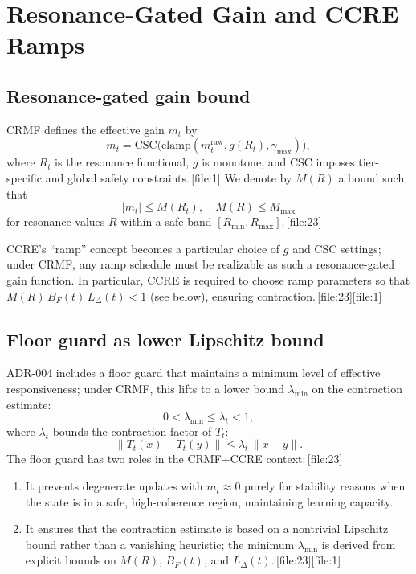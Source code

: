\documentclass[11pt]{article}
\begin{document}
\section{Resonance-Gated Gain and CCRE Ramps}

\subsection{Resonance-gated gain bound}

CRMF defines the effective gain $m_t$ by
\[
  m_t = \mathrm{CSC}\bigl(\mathrm{clamp}(m^{\mathrm{raw}}_t, g(R_t), \gamma_{\max})\bigr),
\]
where $R_t$ is the resonance functional, $g$ is monotone, and CSC imposes tier-specific and global safety constraints.\,[file:1]
We denote by $M(R)$ a bound such that
\begin{equation}
  |m_t| \le M(R_t),\quad M(R) \le M_{\max}
\end{equation}
for resonance values $R$ within a safe band $[R_{\min},R_{\max}]$.\,[file:23]

CCRE's ``ramp'' concept becomes a particular choice of $g$ and CSC settings; under CRMF, any ramp schedule must be realizable as such a resonance-gated gain function.
In particular, CCRE is required to choose ramp parameters so that $M(R)\,B_F(t)\,L_\Delta(t) < 1$ (see below), ensuring contraction.\,[file:23][file:1]

\subsection{Floor guard as lower Lipschitz bound}

ADR-004 includes a floor guard that maintains a minimum level of effective responsiveness; under CRMF, this lifts to a lower bound $\lambda_{\min}$ on the contraction estimate:
\[
  0 < \lambda_{\min} \le \lambda_t < 1,
\]
where $\lambda_t$ bounds the contraction factor of $T_t$:
\[
  \|T_t(x) - T_t(y)\| \le \lambda_t\,\|x-y\|.
\]
The floor guard has two roles in the CRMF+CCRE context:\,[file:23]
\begin{enumerate}[leftmargin=1.5em]
  \item It prevents degenerate updates with $m_t\approx 0$ purely for stability reasons when the state is in a safe, high-coherence region, maintaining learning capacity.
  \item It ensures that the contraction estimate is based on a nontrivial Lipschitz bound rather than a vanishing heuristic; the minimum $\lambda_{\min}$ is derived from explicit bounds on $M(R)$, $B_F(t)$, and $L_\Delta(t)$.\,[file:23][file:1]
\end{enumerate}
\end{document}
